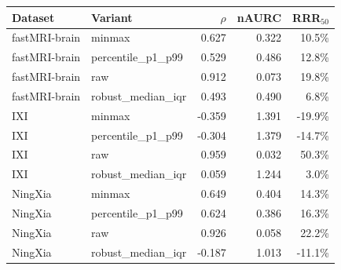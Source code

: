 \begin{tabular}{llrrr}
\toprule
Dataset & Variant & $\rho$ & nAURC & RRR$_{50}$ \\
\midrule
fastMRI-brain & minmax & 0.627 & 0.322 & 10.5\% \\
fastMRI-brain & percentile\_p1\_p99 & 0.529 & 0.486 & 12.8\% \\
fastMRI-brain & raw & 0.912 & 0.073 & 19.8\% \\
fastMRI-brain & robust\_median\_iqr & 0.493 & 0.490 & 6.8\% \\
IXI & minmax & -0.359 & 1.391 & -19.9\% \\
IXI & percentile\_p1\_p99 & -0.304 & 1.379 & -14.7\% \\
IXI & raw & 0.959 & 0.032 & 50.3\% \\
IXI & robust\_median\_iqr & 0.059 & 1.244 & 3.0\% \\
NingXia & minmax & 0.649 & 0.404 & 14.3\% \\
NingXia & percentile\_p1\_p99 & 0.624 & 0.386 & 16.3\% \\
NingXia & raw & 0.926 & 0.058 & 22.2\% \\
NingXia & robust\_median\_iqr & -0.187 & 1.013 & -11.1\% \\
\bottomrule
\end{tabular}
